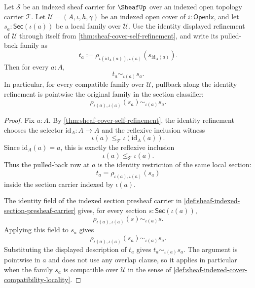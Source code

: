 \begin{theorem}
\label{thm:sheaf-identity-refinement-pullback-identity}
Let $\mathcal{S}$ be an indexed sheaf carrier for $\SheafUp$ over an indexed open topology carrier $\mathcal{T}$. Let $\mathcal{U}=(A,\iota,h,\gamma)$ be an indexed open cover of $i:\mathsf{OpenIx}$, and let $s_a:\mathsf{Sec}(\iota(a))$ be a local family over $\mathcal{U}$. Use the identity displayed refinement of $\mathcal{U}$ through itself from \autoref{thm:sheaf-cover-self-refinement}, and write its pulled-back family as
$$
t_a:=\rho_{\iota(\mathrm{id}_A(a)),\iota(a)}(s_{\mathrm{id}_A(a)}).
$$
Then for every $a:A$,
$$
t_a\sim_{\iota(a)}s_a.
$$
In particular, for every compatible family over $\mathcal{U}$, pullback along the identity refinement is pointwise the original family in the section classifier:
$$
\rho_{\iota(a),\iota(a)}(s_a)\sim_{\iota(a)}s_a.
$$
\end{theorem}
\begin{proof}
Fix $a:A$. By \autoref{thm:sheaf-cover-self-refinement}, the identity refinement chooses the selector $\mathrm{id}_A:A\to A$ and the reflexive inclusion witness
$$
\iota(a)\le_{\mathcal{T}}\iota(\mathrm{id}_A(a)).
$$
Since $\mathrm{id}_A(a)=a$, this is exactly the reflexive inclusion
$$
\iota(a)\le_{\mathcal{T}}\iota(a).
$$
Thus the pulled-back row at $a$ is the identity restriction of the same local section:
$$
t_a=\rho_{\iota(a),\iota(a)}(s_a)
$$
inside the section carrier indexed by $\iota(a)$.

The identity field of the indexed section presheaf carrier in \autoref{def:sheaf-indexed-section-presheaf-carrier} gives, for every section $s:\mathsf{Sec}(\iota(a))$,
$$
\rho_{\iota(a),\iota(a)}(s)\sim_{\iota(a)}s.
$$
Applying this field to $s_a$ gives
$$
\rho_{\iota(a),\iota(a)}(s_a)\sim_{\iota(a)}s_a.
$$
Substituting the displayed description of $t_a$ gives $t_a\sim_{\iota(a)}s_a$. The argument is pointwise in $a$ and does not use any overlap clause, so it applies in particular when the family $s_a$ is compatible over $\mathcal{U}$ in the sense of \autoref{def:sheaf-indexed-cover-compatibility-locality}.
\end{proof}
